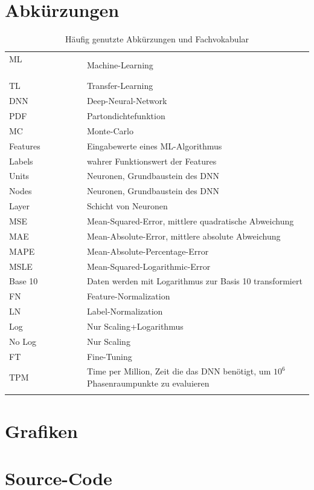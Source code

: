 \section{Abkürzungen}
\begin{table}[htp]
	\centering
	\begin{tabular}{ll}
		ML $\hspace{3cm}$& Machine-Learning \\
		TL & Transfer-Learning \\
		DNN & Deep-Neural-Network \\
		PDF & Partondichtefunktion \\
		MC & Monte-Carlo \\
		Features & Eingabewerte eines ML-Algorithmus \\
		Labels & wahrer Funktionswert der Features \\
		Units & Neuronen, Grundbaustein des DNN \\
		Nodes & Neuronen, Grundbaustein des DNN \\
		Layer & Schicht von Neuronen \\
		MSE & Mean-Squared-Error, mittlere quadratische Abweichung \\
		MAE & Mean-Absolute-Error, mittlere absolute Abweichung \\
		MAPE & Mean-Absolute-Percentage-Error\\
		MSLE & Mean-Squared-Logarithmic-Error \\
		Base 10& Daten werden mit Logarithmus zur Basis 10 transformiert \\
		FN & Feature-Normalization \\
		LN & Label-Normalization \\
		Log & Nur Scaling+Logarithmus \\
		No Log & Nur Scaling\\
		FT & Fine-Tuning \\
		TPM & Time per Million, Zeit die das DNN benötigt, um $10^6$ Phasenraumpunkte zu evaluieren \\
		&\\
	\end{tabular}
	\caption{Häufig genutzte Abkürzungen und Fachvokabular}
\end{table}

\section{Grafiken}
\section{Source-Code}

